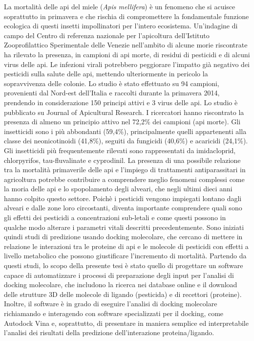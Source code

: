 La mortalità delle api del miele (\textit{Apis mellifera}) è un fenomeno che si acuisce soprattutto in primavera e che rischia di compromettere la fondamentale funzione ecologica di questi insetti impollinatori per l’intero ecosistema.\newline
Un’indagine di campo del Centro di referenza nazionale per l’apicoltura dell’Istituto Zooprofilattico Sperimentale delle Venezie nell’ambito di alcune morie riscontrate ha rilevato la presenza, in campioni di api morte, di residui di pesticidi e di alcuni virus delle api. Le infezioni virali potrebbero peggiorare l’impatto già negativo dei pesticidi sulla salute delle api, mettendo ulteriormente in pericolo la sopravvivenza delle colonie.\newline
Lo studio è stato effettuato su 94 campioni, provenienti dal Nord-est dell’Italia e raccolti durante la primavera 2014, prendendo in considerazione 150 principi attivi e 3 virus delle api. Lo studio è pubblicato su Journal of Apicultural Research. I ricercatori hanno riscontrato la presenza di almeno un principio attivo nel 72,2\% dei campioni (api morte). Gli insetticidi sono i più abbondanti (59,4\%), principalmente quelli appartenenti alla classe dei neonicotinoidi (41,8\%), seguiti da fungicidi (40,6\%) e acaricidi (24,1\%). Gli insetticidi più frequentemente rilevati sono rappresentati da imidacloprid, chlorpyrifos, tau-fluvalinate e cyprodinil.\newline
La presenza di una possibile relazione tra la mortalità primaverile delle api e l’impiego di trattamenti antiparassitari in agricoltura potrebbe contribuire a comprendere meglio fenomeni complessi come la moria delle api e lo spopolamento degli alveari, che negli ultimi dieci anni hanno colpito questo settore\cite{martinello2017spring}.\newline
Poichè i pesticidi vengono impiegati lontano dagli alveari e dalle zone loro circostanti, diventa importante comprendere quali sono gli effetti dei pesticidi a concentrazioni sub-letali e come questi possono in qualche modo alterare i parametri vitali descritti precedentemente. Sono iniziati quindi studi di predizione usando docking molecolare, che cercano di mettere in relazione le interazioni tra le proteine di api e le molecole di pesticidi con effetti a livello metabolico che possono giustificare l’incremento di mortalità. Partendo da questi studi, lo scopo della presente tesi è stato quello di progettare un software capace di automatizzare i processi di preparazione degli input per l’analisi di docking molecolare, che includono la ricerca nei database online e il download delle strutture 3D delle molecole di ligando (pesticida) e di recettori (proteine). Inoltre, il software è in grado di eseguire l’analisi di docking molecolare richiamando e interagendo con software specializzati per il docking, come Autodock Vina e, soprattutto, di presentare in maniera semplice ed interpretabile l’analisi dei risultati della predizione dell’interazione proteina/ligando.\newline

